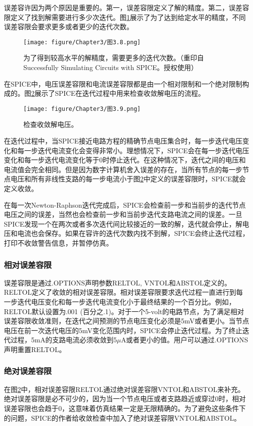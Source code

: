 误差容许因为两个原因是重要的。第一，误差容限定义了解的精度。第二，误差容限定义了找到解需要进行多少次迭代。图\ref{图3.8}展示了为了达到给定水平的精度，不同误差容限会要求更多或者更少的迭代次数。
\begin{figure}[htbp]
\small
    \centering
    \texttt{[image: figure/Chapter3/图3.8.png]}
    \caption{为了得到较高水平的解精度，需要更多的迭代次数。（重印自Successfully Simulating Circuits with SPICE。授权使用）}
    \label{图3.8}
\end{figure}

在SPICE中，电压误差容限和电流误差容限都是由一个相对限制和一个绝对限制构成的。图\ref{图3.9}展示了SPICE在迭代过程中用来检查收敛解电压的流程。
\begin{figure}[htbp]
\small
    \centering
    \texttt{[image: figure/Chapter3/图3.9.png]}
    \caption{检查收敛解电压。}
    \label{图3.9}
\end{figure}

在迭代过程中，当SPICE接近电路方程的精确节点电压集合时，每一步迭代电压变化和每一步迭代电流变化会变得非常小。理想情况下，SPICE会在每一步迭代电压变化和每一步迭代电流变化等于0时停止迭代。在这种情况下，迭代之间的电压和电流值会完全相同。但是因为数字计算机舍入误差的存在，当所有节点的每一步节点电压和所有非线性支路的每一步电流小于图\ref{图3.9}中定义的误差容限时，SPICE就会定义收敛。

在每一次Newton-Raphson迭代完成后，SPICE会检查前一步和当前步的迭代节点电压之间的误差，当然也会检查前一步和当前步迭代支路电流之间的误差。一旦SPICE发现一个在两次或者多次迭代间比较接近的一致的解，迭代就会停止，解电压和电流也会保存。如果在容许的迭代次数内找不到解，SPICE会终止迭代过程，打印不收敛警告信息，并暂停仿真。

\subsubsection{相对误差容限}
误差容限是通过.OPTIONS声明参数RELTOL, VNTOL和ABSTOL定义的。RELTOL定义了收敛的相对误差容限。相对误差容限要求迭代过程一直进行到每一步迭代电压变化和每一步迭代电流变化小于最终结果的一个百分比。例如，RELTOL默认设置为.001 (百分之.1)。对于一个5-volt的电路节点，为了满足相对误差容限收敛准则，在迭代之间预测的节点电压变化必须是5mV或者更小。当节点电压在前一次迭代电压的5mV变化范围内时，SPICE会停止迭代过程。为了终止迭代过程，5mA的支路电流必须收敛到5$\mu$A或者更小的值。用户可以通过.OPTIONS声明重置RELTOL。

\subsubsection{绝对误差容限}
在图\ref{图3.9}中，相对误差容限RELTOL通过绝对误差容限VNTOL和ABSTOL来补充。绝对误差容限是必不可少的，因为当一个节点电压或者支路趋近或穿过0时，相对误差容限也会趋于0，这意味着仿真结果一定是无限精确的。为了避免这些条件下的问题，SPICE的作者给收敛检查中加入了绝对误差容限VNTOL和ABSTOL。

